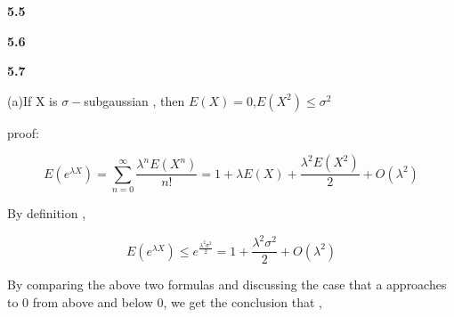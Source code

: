 












\noindent\textbf{5.5}



\noindent\textbf{5.6}


\noindent\textbf{5.7}


(a)If X is $\sigma-$subgaussian , then $E(X)=0$,$E(X^2)\leq\sigma^2$

proof:

\begin{equation}
E(e^{\lambda X}) = \sum_{n=0}^{\infty}\frac{\lambda^n E(X^n)}{n!}=1+\lambda E(X)+\frac{\lambda^2 E(X^2)}{2}+O(\lambda^2)
\end{equation}

By definition ,

\begin{equation}
E(e^{\lambda X})\leq e^{\frac{\lambda^2 \sigma^2}{2}}=1+\frac{\lambda^2 \sigma^2}{2}+O(\lambda^2)
\end{equation}

By comparing the above two formulas and discussing the case that a approaches to 0 from above and below 0, we get the conclusion that ,

